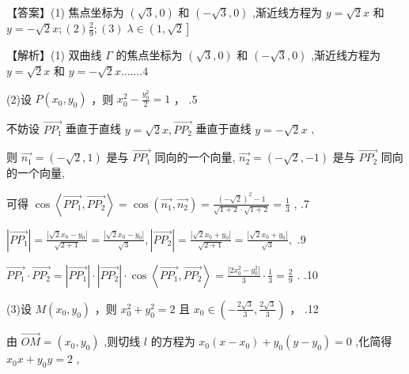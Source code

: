 \documentclass[10pt]{article}
\begin{document}
【答案】(1) 焦点坐标为 \(\left( {\sqrt{3},0}\right)\) 和 \(\left( {-\sqrt{3},0}\right)\) ,渐近线方程为 \(y = \sqrt{2}x\) 和 \(y =  - \sqrt{2}x;\left( 2\right) \frac{2}{9};\left( 3\right) \; \lambda  \in  \left( {1,\sqrt{2}}\right\rbrack\)

【解析】(1) 双曲线 \(\Gamma\) 的焦点坐标为 \(\left( {\sqrt{3},0}\right)\) 和 \(\left( {-\sqrt{3},0}\right)\) ,渐近线方程为 \(y = \sqrt{2}x\) 和 \(y =  - \sqrt{2}x\ldots \ldots {.4}\)

(2)设 \(P\left( {{x}_{0},{y}_{0}}\right)\) ，则 \({x}_{0}^{2} - \frac{{y}_{0}^{2}}{2} = 1\) ， .5

不妨设 \(\overrightarrow{P{P}_{1}}\) 垂直于直线 \(y = \sqrt{2}x,\overrightarrow{P{P}_{2}}\) 垂直于直线 \(y =  - \sqrt{2}x\) ,

则 \(\overrightarrow{{n}_{1}} = \left( {-\sqrt{2},1}\right)\) 是与 \(\overrightarrow{P{P}_{1}}\) 同向的一个向量, \(\overrightarrow{{n}_{2}} = \left( {-\sqrt{2}, - 1}\right)\) 是与 \(\overrightarrow{P{P}_{2}}\) 同向的一个向量,

可得 \(\cos \left\langle  {\overrightarrow{P{P}_{1}},\overrightarrow{P{P}_{2}}}\right\rangle   = \cos \left( {\overrightarrow{{n}_{1}},\overrightarrow{{n}_{2}}}\right)  = \frac{{\left( -\sqrt{2}\right) }^{2} - 1}{\sqrt{1 + 2} \cdot  \sqrt{1 + 2}} = \frac{1}{3}\) , .7

\(\left| \overrightarrow{P{P}_{1}}\right|  = \frac{\left| \sqrt{2}{x}_{0} - {y}_{0}\right| }{\sqrt{2 + 1}} = \frac{\left| \sqrt{2}{x}_{0} - {y}_{0}\right| }{\sqrt{3}},\left| \overrightarrow{P{P}_{2}}\right|  = \frac{\left| \sqrt{2}{x}_{0} + {y}_{0}\right| }{\sqrt{2 + 1}} = \frac{\left| \sqrt{2}{x}_{0} + {y}_{0}\right| }{\sqrt{3}},\) .9

\(\overrightarrow{P{P}_{1}} \cdot  \overrightarrow{P{P}_{2}} = \left| \overrightarrow{P{P}_{1}}\right|  \cdot  \left| \overrightarrow{P{P}_{2}}\right|  \cdot  \cos \left\langle  {\overrightarrow{P{P}_{1}},\overrightarrow{P{P}_{2}}}\right\rangle   = \frac{\left| 2{x}_{0}^{2} - {y}_{0}^{2}\right| }{3} \cdot  \frac{1}{3} = \frac{2}{9}\) . .10

(3)设 \(M\left( {{x}_{0},{y}_{0}}\right)\) ，则 \({x}_{0}^{2} + {y}_{0}^{2} = 2\) 且 \({x}_{0} \in  \left( {-\frac{2\sqrt{3}}{3},\frac{2\sqrt{3}}{3}}\right)\) ， .12

由 \(\overrightarrow{OM} = \left( {{x}_{0},{y}_{0}}\right)\) ,则切线 \(l\) 的方程为 \({x}_{0}\left( {x - {x}_{0}}\right)  + {y}_{0}\left( {y - {y}_{0}}\right)  = 0\) ,化简得 \({x}_{0}x + {y}_{0}y = 2\) ,
\end{document}
